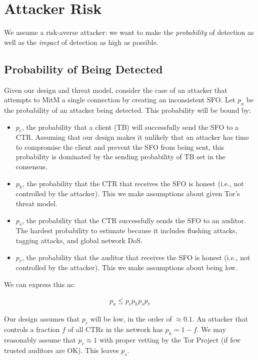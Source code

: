 \section{Attacker Risk}
We assume a risk-averse attacker: we want to make the \emph{probability} of
detection as well as the \emph{impact} of detection as high as possible.

\subsection{Probability of Being Detected}
Given our design and threat model, consider the case of an attacker that
attempts to MitM a single connection by creating an inconsistent SFO. Let $p_a$
be the probability of an attacker being detected. This probability will be bound
by:

\begin{itemize}
    \item $p_c$, the probability that a client (TB) will successfully send the
    SFO to a CTR. Assuming that our design makes it unlikely that an attacker
    has time to compromise the client and prevent the SFO from being sent, this
    probability is dominated by the sending probability of TB set in the
    consensus.
    \item $p_h$, the probability that the CTR that receives the SFO is honest
    (i.e., not controlled by the attacker). This we make assumptions about given
    Tor's threat model.
    \item $p_s$, the probability that the CTR successfully sends the SFO to an
    auditor. The hardest probability to estimate because it includes flushing
    attacks, tagging attacks, and global network DoS.
    \item $p_r$, the probability that the auditor that receives the SFO is
    honest (i.e., not controlled by the attacker). This we make assumptions
    about being low.
\end{itemize}

We can express this as:  

\begin{align}
    p_a \leq p_c p_h p_s p_r
\end{align}

Our design assumes that $p_c$ will be low, in the order of $\approx0.1$. An
attacker that controls a fraction $f$ of all CTRs in the network has $p_h =
1-f$. We may reasonably assume that $p_r \approx 1$ with proper vetting by the
Tor Project (if few trusted auditors are OK). This leaves $p_s$.

